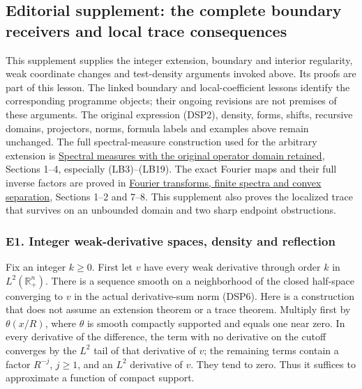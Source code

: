 \documentclass[
  11pt,
]{article}
\makeatletter
\let\ReaderOriginalAnchorStart\hyper@anchorstart
\let\ReaderOriginalAnchorEnd\hyper@anchorend
\let\ReaderPendingAliases\@empty
\def\ReaderArmAliases#1{\gdef\ReaderPendingAliases{#1}}
\def\hyper@anchorstart#1{\ReaderIfNativeAnchorTF{#1}{\ReaderPendingAliases\global\let\ReaderPendingAliases\@empty}{}\ReaderOriginalAnchorStart{#1}}
\makeatother
\begin{document}
\subsection{Editorial supplement: the complete boundary receivers and
local trace
consequences}\label{editorial-supplement-the-complete-boundary-receivers-and-local-trace-consequences}

This supplement supplies the integer extension, boundary and interior
regularity, weak coordinate changes and test-density arguments invoked
above. Its proofs are part of this lesson. The linked boundary and
local-coefficient lessons identify the corresponding programme objects;
their ongoing revisions are not premises of these arguments. The
original expression (DSP2), density, forms, shifts, recursive domains,
projectors, norms, formula labels and examples above remain unchanged.
The full spectral-measure construction used for the arbitrary extension
is \href{lower-bounded-spectral-calculus.pdf}{Spectral measures with the
original operator domain retained}, Sections 1--4, especially
(LB3)--(LB19). The exact Fourier maps and their full inverse factors are
proved in \href{prerequisite-bridges.pdf}{Fourier transforms, finite
spectra and convex separation}, Sections 1--2 and 7--8. This supplement
also proves the localized trace that survives on an unbounded domain and
two sharp endpoint obstructions.

\ReaderArmAliases{\ReaderOriginalAnchorStart{e1.-integer-weak-derivative-spaces-density-and-reflection}\ReaderOriginalAnchorEnd}
\subsubsection{E1. Integer weak-derivative spaces, density and
reflection}\label{e1.-integer-weak-derivative-spaces-density-and-reflection}

Fix an integer \(k\geq0\). First let \(v\) have every weak derivative
through order \(k\) in \(L^2(\mathbb R^n_+)\). There is a sequence
smooth on a neighborhood of the closed half-space converging to \(v\) in
the actual derivative-sum norm (DSP6). Here is a construction that does
not assume an extension theorem or a trace theorem. Multiply first by
\(\theta(x/R)\), where \(\theta\) is smooth compactly supported and
equals one near zero. In every derivative of the difference, the term
with no derivative on the cutoff converges by the \(L^2\) tail of that
derivative of \(v\); the remaining terms contain a factor \(R^{-j}\),
\(j\geq1\), and an \(L^2\) derivative of \(v\). They tend to zero. Thus
it suffices to approximate a function of compact support.
\end{document}
